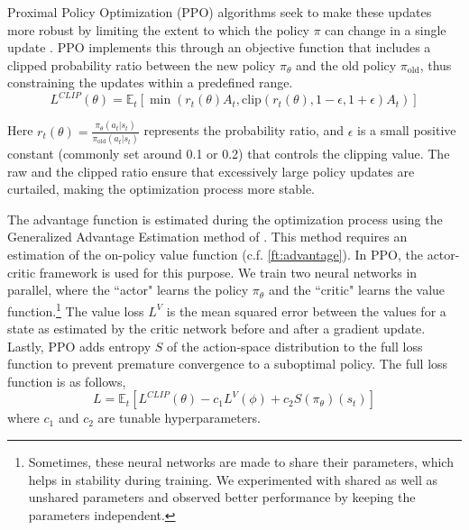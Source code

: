 Proximal Policy Optimization (PPO) algorithms seek to make these updates more robust by limiting the extent to which the policy \( \pi \) can change in a single update \cite{schulman2017proximal}.
PPO implements this through an objective function that includes a clipped probability ratio between the new policy \( \pi_\theta \) and the old policy \( \pi_{\text{old}} \), thus constraining the updates within a predefined range.
\[
L^{CLIP}(\theta) = \mathbb{E}_{t} \left[ \min(r_t(\theta) A_t, \text{clip}(r_t(\theta), 1 - \epsilon, 1 + \epsilon) A_t) \right]
\]

Here \( r_t(\theta) = \frac{\pi_\theta(a_t | s_t)}{\pi_{\text{old}}(a_t | s_t)} \) represents the probability ratio, and \( \epsilon \) is a small positive constant (commonly set around 0.1 or 0.2) that controls the clipping value.
The raw and the clipped ratio ensure that excessively large policy updates are curtailed, making the optimization process more stable.

The advantage function is estimated during the optimization process using the Generalized Advantage Estimation method of \cite{schulman2018highdimensional}.
This method requires an estimation of the on-policy value function (c.f. \autoref{ft:advantage}).
In PPO, the actor-critic framework is used for this purpose. We train two neural networks in parallel, where the ``actor" learns the policy $\pi_\theta$ and the ``critic" learns the value function.\footnote{
Sometimes, these neural networks are made to share their parameters, which helps in stability during training.
We experimented with shared as well as unshared parameters and observed better performance by keeping the parameters independent.}
The value loss $L^V$ is the mean squared error between the values for a state as estimated by the critic network before and after a gradient update.
Lastly, PPO adds entropy $S$ of the action-space distribution to the full loss function to prevent premature convergence to a suboptimal policy. The full loss function is as follows,
\[
L = \mathbb{E}_{t} \left[ L^{CLIP}(\theta) - c_1 L^{V}(\phi) + c_2 S(\pi_\theta)(s_t) \right]
\]
where $c_1$ and $c_2$ are tunable hyperparameters.

